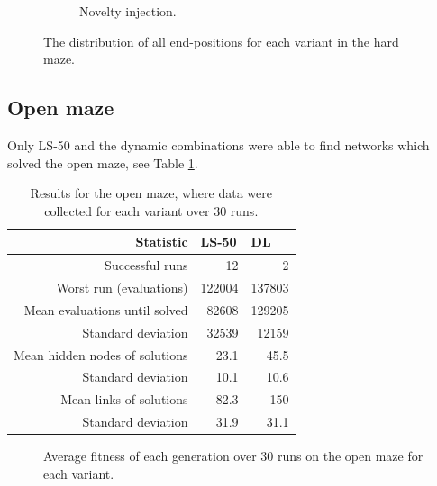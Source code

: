 \begin{figure}[H]
\begin{mdframed}
\begin{subfigure}[b]{0.5\textwidth}
            \caption{Novelty injection.}
        \end{subfigure}
    \end{mdframed}
    \caption{The distribution of all end-positions for each variant in the hard maze.}
    \label{distribution}
\end{figure}

\subsection{Open maze}
Only LS-50 and the dynamic combinations were able to find networks which solved the open maze, see Table \ref{open}.
\begin{table}[H]
    \centering
    \begin{tabular}{rrr}
    \toprule
    Statistic & \multicolumn{1}{l}{LS-50} & \multicolumn{1}{l}{DL} \\
    \midrule
    Successful runs & 12 & 2 \\
    Worst run (evaluations) & 122004 & 137803 \\
    \rowcolor[gray]{.9} Mean evaluations until solved & 82608 & 129205 \\
    Standard deviation & 32539  & 12159 \\
    \rowcolor[gray]{.9} Mean hidden nodes of solutions & 23.1 & 45.5 \\
    Standard deviation & 10.1 & 10.6 \\
    \rowcolor[gray]{.9} Mean links of solutions & 82.3  & 150 \\
    Standard deviation & 31.9  & 31.1 \\
    \bottomrule
    \end{tabular}
    \caption{Results for the open maze, where data were collected for each variant over 30 runs.}
    \label{open}
\end{table}

\begin{figure}[H]
    \begin{center}
        
    \end{center}
    \caption{Average fitness of each generation over 30 runs on the open maze for each variant.}
    \label{hard_fitness}
\end{figure}

